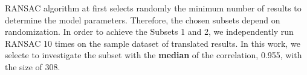 %
RANSAC algorithm at first selects randomly the minimum number of results to determine the model parameters. Therefore, the chosen subsets depend on randomization. In order to achieve the Subsets 1 and 2, we independently run RANSAC 10 times on the sample dataset of translated results. In this work, we selecte to investigate the subset with the \textbf{median} of the correlation, 0.955, with the size of 308.
%



%

